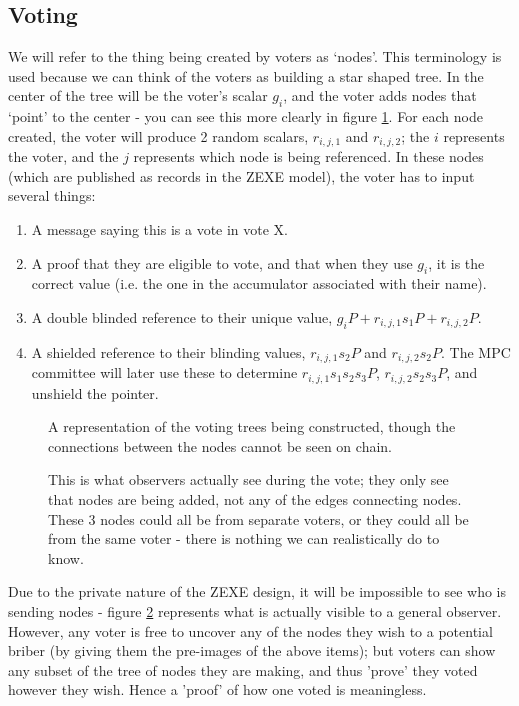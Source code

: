 \documentclass{article}
\begin{document}
\subsection{Voting}
We will refer to the thing being created by voters as `nodes'. This terminology is used because we can think of the voters as building a star shaped tree. In the center of the tree will be the voter's scalar $g_i$, and the voter adds nodes that `point' to the center - you can see this more clearly in figure \ref{fig:figure1}. For each node created, the voter will produce 2 random scalars, $r_{i,j,1}$ and $r_{i,j,2}$; the $i$ represents the voter, and the $j$ represents which node is being referenced. In these nodes (which are published as records in the ZEXE model), the voter has to input several things:
\begin{enumerate}
    \item A message saying this is a vote in vote X.
    \item A proof that they are eligible to vote, and that when they use $g_i$, it is the correct value (i.e. the one in the accumulator associated with their name).
    \item A double blinded reference to their unique value, $g_iP + r_{i,j,1}s_1P + r_{i,j,2}P$.
    \item A shielded reference to their blinding values, $r_{i,j,1}s_2P$ and $r_{i,j,2}s_2P$. The MPC committee will later use these to determine $r_{i,j,1}s_1s_2s_3P$, $r_{i,j,2}s_2s_3P$, and unshield the pointer.
\end{enumerate}

\begin{figure}[h!]
        \centering
        
        \caption{A representation of the voting trees being constructed, though the connections between the nodes cannot be seen on chain.}
        \label{fig:figure1}
\end{figure}

\begin{figure}[h!]
        \centering
        
        \caption{This is what observers actually see during the vote; they only see that nodes are being added, not any of the edges connecting nodes. These 3 nodes could all be from separate voters, or they could all be from the same voter - there is nothing we can realistically do to know.}
        \label{fig:figure2}
\end{figure}

Due to the private nature of the ZEXE design, it will be impossible to see who is sending nodes - figure \ref{fig:figure2} represents what is actually visible to a general observer. However, any voter is free to uncover any of the nodes they wish to a potential briber (by giving them the pre-images of the above items); but voters can show any subset of the tree of nodes they are making, and thus 'prove' they voted however they wish. Hence a 'proof' of how one voted is meaningless.
\end{document}
